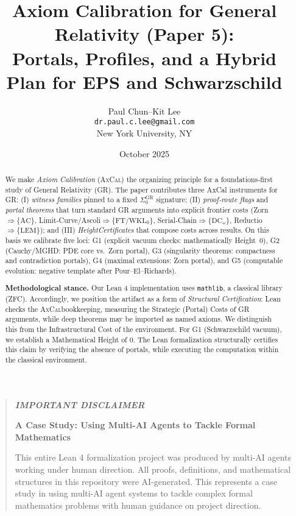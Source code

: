 \documentclass[11pt]{article}
\title{Axiom Calibration for General Relativity (Paper 5):\\
Portals, Profiles, and a Hybrid Plan for EPS and Schwarzschild}
\author{Paul Chun--Kit Lee\\
\texttt{dr.paul.c.lee@gmail.com}\\
New York University, NY}
\date{October 2025}
\newenvironment{mdframed}[1][]{\begin{quote}\itshape}{\end{quote}}
\theoremstyle{definition}
\theoremstyle{remark}
\newcommand{\LEM}{\mathrm{LEM}}
\newcommand{\FT}{\mathrm{FT}}
\newcommand{\WKLz}{\mathrm{WKL}_0}
\newcommand{\AC}{\mathrm{AC}}
\newcommand{\DCw}{\mathrm{DC}_\omega}
\newcommand{\SigmaZero}{\Sigma_{0}}
\newcommand{\AxCal}{\textsc{AxCal}}
\begin{document}
\maketitle

\begin{abstract}
We make \emph{Axiom Calibration} (\AxCal) the organizing principle for a foundations‑first study of General Relativity (GR). The paper contributes three AxCal instruments for GR: (I) \emph{witness families} pinned to a fixed $\SigmaZero^{\mathrm{GR}}$ signature; (II) \emph{proof‑route flags} and \emph{portal theorems} that turn standard GR arguments into explicit frontier costs (Zorn$\Rightarrow\{\AC\}$, Limit‑Curve/Ascoli$\Rightarrow\{\FT/\WKLz\}$, Serial‑Chain$\Rightarrow\{\DCw\}$, Reductio$\Rightarrow\{\LEM\}$); and (III) \emph{HeightCertificates} that compose costs across results. On this basis we calibrate five loci: G1 (explicit vacuum checks: mathematically Height~0), G2 (Cauchy/MGHD: PDE core vs.\ Zorn portal), G3 (singularity theorems: compactness and contradiction portals), G4 (maximal extensions: Zorn portal), and G5 (computable evolution: negative template after Pour–El–Richards).

\medskip
\textbf{Methodological stance.} Our Lean 4 implementation uses \texttt{mathlib}, a classical library (ZFC). Accordingly, we position the artifact as a form of \emph{Structural Certification}: Lean checks the \AxCal bookkeeping, measuring the Strategic (Portal) Costs of GR arguments, while deep theorems may be imported as named axioms. We distinguish this from the Infrastructural Cost of the environment. For G1 (Schwarzschild vacuum), we establish a Mathematical Height of 0. The Lean formalization structurally certifies this claim by verifying the absence of portals, while executing the computation within the classical environment.
\end{abstract}

\begin{mdframed}[backgroundcolor=gray!10, linewidth=0pt]
\textbf{IMPORTANT DISCLAIMER}

\textbf{A Case Study: Using Multi-AI Agents to Tackle Formal Mathematics}

This entire Lean 4 formalization project was produced by multi-AI agents working under human direction. All proofs, definitions, and mathematical structures in this repository were AI-generated. This represents a case study in using multi-AI agent systems to tackle complex formal mathematics problems with human guidance on project direction.
\end{mdframed}
\end{document}
